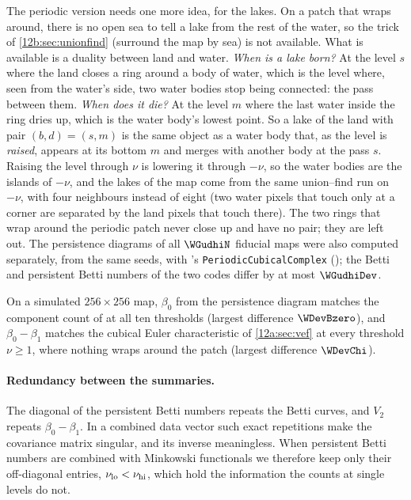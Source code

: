 The periodic version needs one more idea, for the lakes. On a patch that wraps around, there is no open sea to tell
a lake from the rest of the water, so the trick of \cref{12b:sec:unionfind} (surround the map by sea) is not available.
What is available is a duality between land and water. \emph{When is a lake born?} At the level $s$ where the land
closes a ring around a body of water, which is the level where, seen from the water's side, two water bodies stop
being connected: the pass between them. \emph{When does it die?} At the level $m$ where the last water inside the
ring dries up, which is the water body's lowest point. So a lake of the land with pair $(b,d)=(s,m)$ is the same
object as a water body that, as the level is \emph{raised}, appears at its bottom $m$ and merges with another body at
the pass $s$. Raising the level through $\nu$ is lowering it through $-\nu$, so the water bodies are the islands of
$-\nu$, and the lakes of the map come from the same union--find run on $-\nu$, with four neighbours instead of eight
(two water pixels that touch only at a corner are separated by the land pixels that touch there). The two rings that
wrap around the periodic patch never close up and have no pair; they are left out. The persistence diagrams of all
$\WGudhiN$ fiducial maps were also computed separately, from the same seeds, with 's
\texttt{PeriodicCubicalComplex} (); the Betti and persistent Betti numbers of the two codes differ by at most
$\WGudhiDev$.

On a simulated $256\times256$ map,
$\beta_0$ from the persistence diagram matches the component count of  at all ten thresholds (largest
difference $\WDevBzero$), and $\beta_0-\beta_1$ matches the cubical Euler characteristic of \cref{12a:sec:vef} at
every threshold $\nu\ge1$, where nothing wraps around the patch (largest difference $\WDevChi$).

\paragraph{Redundancy between the summaries.} The diagonal of the persistent Betti numbers repeats the Betti curves,
and $V_2$ repeats $\beta_0-\beta_1$. In a combined data vector such exact repetitions make the covariance matrix
singular, and its inverse meaningless. When persistent Betti numbers are combined with Minkowski functionals we
therefore keep only their off-diagonal entries, $\nu_{\rm lo}<\nu_{\rm hi}$, which hold the information the counts at
single levels do not.

